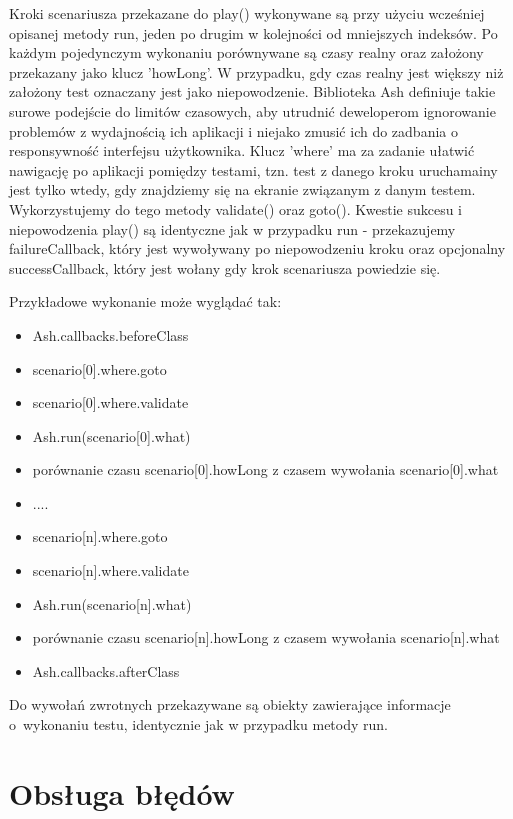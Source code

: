 \documentclass[brudnopis]{xmgr}
\begin{document}
Kroki scenariusza przekazane do play() wykonywane są przy użyciu wcześniej opisanej metody run, jeden po drugim w kolejności od mniejszych indeksów. Po każdym pojedynczym wykonaniu porównywane są czasy realny oraz założony przekazany jako klucz 'howLong'. W przypadku, gdy czas realny jest większy niż założony test oznaczany jest jako niepowodzenie. Biblioteka Ash definiuje takie surowe podejście do limitów czasowych, aby utrudnić deweloperom ignorowanie problemów z wydajnością ich aplikacji i niejako zmusić ich do zadbania o responsywność interfejsu użytkownika. Klucz 'where' ma za zadanie ułatwić nawigację po aplikacji pomiędzy testami, tzn. test z danego kroku uruchamainy jest tylko wtedy, gdy znajdziemy się na ekranie związanym z danym testem. Wykorzystujemy do tego metody validate() oraz goto(). Kwestie sukcesu i niepowodzenia play() są identyczne jak w przypadku run - przekazujemy failureCallback, który jest wywoływany po niepowodzeniu kroku oraz opcjonalny successCallback,  który jest wołany gdy krok scenariusza powiedzie się. 

Przykładowe wykonanie może wyglądać tak:

\begin{itemize}
  \item Ash.callbacks.beforeClass
  \item scenario[0].where.goto
  \item scenario[0].where.validate
  \item Ash.run(scenario[0].what)
  \item porównanie czasu scenario[0].howLong z czasem wywołania scenario[0].what
  \item ....
  \item scenario[n].where.goto
  \item scenario[n].where.validate
  \item Ash.run(scenario[n].what)
  \item porównanie czasu scenario[n].howLong z czasem wywołania scenario[n].what
  \item Ash.callbacks.afterClass
\end{itemize}

Do wywołań zwrotnych przekazywane są obiekty zawierające informacje o~wykonaniu testu, identycznie jak w przypadku metody run.

\section{Obsługa błędów}
\end{document}
